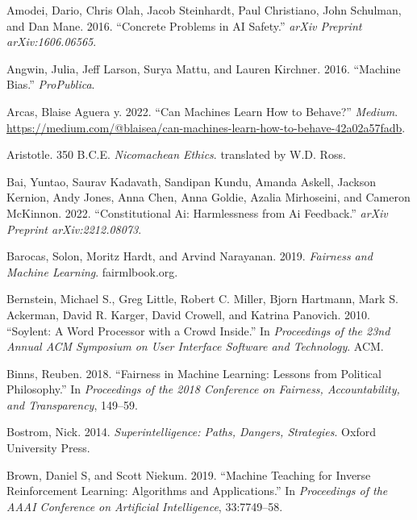 \documentclass[
  letterpaper,
  numbers=noenddot,
  DIV=11]{scrreprt}
\newlength{\cslhangindent}
\newenvironment{CSLReferences}[2] %
 {\begin{list}{}{%
  \setlength{\itemindent}{0pt}
  \setlength{\leftmargin}{0pt}
  \setlength{\parsep}{0pt}
  \ifodd #1
   \setlength{\leftmargin}{\cslhangindent}
   \setlength{\itemindent}{-1\cslhangindent}
  \fi
  \setlength{\itemsep}{#2\baselineskip}}}
 {\end{list}}
\theoremstyle{definition}
\theoremstyle{plain}
\theoremstyle{plain}
\theoremstyle{remark}
\begin{document}
\label{refs-5}
\begin{CSLReferences}{1}{0}
Amodei, Dario, Chris Olah, Jacob Steinhardt, Paul Christiano, John
Schulman, and Dan Mane. 2016. {``Concrete Problems in AI Safety.''}
\emph{arXiv Preprint arXiv:1606.06565}.

Angwin, Julia, Jeff Larson, Surya Mattu, and Lauren Kirchner. 2016.
{``Machine Bias.''} \emph{ProPublica}.

Arcas, Blaise Aguera y. 2022. {``Can Machines Learn How to Behave?''}
\emph{Medium}.
\url{https://medium.com/@blaisea/can-machines-learn-how-to-behave-42a02a57fadb}.

Aristotle. 350 B.C.E. \emph{Nicomachean Ethics}. translated by W.D.
Ross.

Bai, Yuntao, Saurav Kadavath, Sandipan Kundu, Amanda Askell, Jackson
Kernion, Andy Jones, Anna Chen, Anna Goldie, Azalia Mirhoseini, and
Cameron McKinnon. 2022. {``Constitutional Ai: {Harmlessness} from Ai
Feedback.''} \emph{arXiv Preprint arXiv:2212.08073}.

Barocas, Solon, Moritz Hardt, and Arvind Narayanan. 2019. \emph{Fairness
and Machine Learning}. fairmlbook.org.

Bernstein, Michael S., Greg Little, Robert C. Miller, Bjorn Hartmann,
Mark S. Ackerman, David R. Karger, David Crowell, and Katrina Panovich.
2010. {``Soylent: A Word Processor with a Crowd Inside.''} In
\emph{Proceedings of the 23nd Annual ACM Symposium on User Interface
Software and Technology}. ACM.

Binns, Reuben. 2018. {``Fairness in Machine Learning: Lessons from
Political Philosophy.''} In \emph{Proceedings of the 2018 Conference on
Fairness, Accountability, and Transparency}, 149--59.

Bostrom, Nick. 2014. \emph{Superintelligence: Paths, Dangers,
Strategies}. Oxford University Press.

Brown, Daniel S, and Scott Niekum. 2019. {``Machine Teaching for Inverse
Reinforcement Learning: Algorithms and Applications.''} In
\emph{Proceedings of the AAAI Conference on Artificial Intelligence},
33:7749--58.


\end{CSLReferences}
\end{document}
